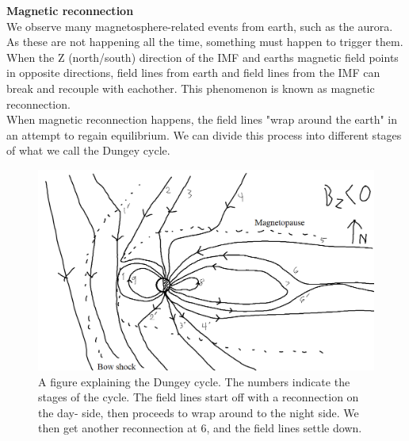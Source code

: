 \documentclass[norsk,a4paper,12pt]{article}
\begin{document}
	\textbf{Magnetic reconnection}\\
	We observe many magnetosphere-related events from earth, such as the aurora. As these are not happening all the time, something must happen to 				trigger them.\\  
	When the Z (north/south) direction of the IMF and earths magnetic field points in opposite directions, field lines from earth and field lines from the IMF can 			break and recouple with eachother. This phenomenon is known as magnetic reconnection.\\
	When magnetic reconnection happens, the field lines "wrap around the earth" in an attempt to regain equilibrium. We can divide this process into different 			stages of what we call the Dungey cycle.
	\begin{figure}[H]
		\includegraphics[scale = 0.5]{Figures/Dungey_cycle_negative.png}
		\centering
		\caption{A figure explaining the Dungey cycle. The numbers indicate the stages of the cycle. The field lines start off with a reconnection on the day-						side, then proceeds to wrap around to the night side. We then get another reconnection at 6, and the field lines settle down. }
		\label{fig::dungey_cycle}
	\end{figure}
\end{document}
